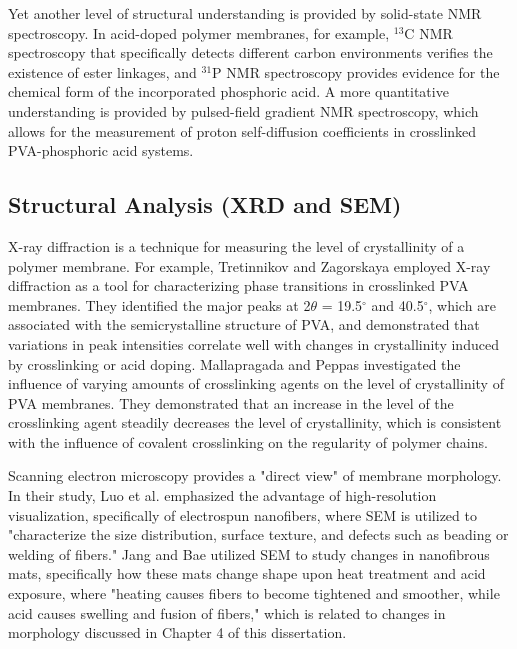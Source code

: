 \documentclass[12pt,a4paper]{report}
\begin{document}
Yet another level of structural understanding is provided by solid-state NMR spectroscopy. In acid-doped polymer membranes, for example, \(^{13}\)C NMR spectroscopy that specifically detects different carbon environments verifies the existence of ester linkages, and \(^{31}\)P NMR spectroscopy provides evidence for the chemical form of the incorporated phosphoric acid.\cite{52,59} A more quantitative understanding is provided by pulsed-field gradient NMR spectroscopy, which allows for the measurement of proton self-diffusion coefficients in crosslinked PVA-phosphoric acid systems.\cite{60}

\subsection{Structural Analysis (XRD and SEM)}
X-ray diffraction is a technique for measuring the level of crystallinity of a polymer membrane. For example, Tretinnikov and Zagorskaya employed X-ray diffraction as a tool for characterizing phase transitions in crosslinked PVA membranes. They identified the major peaks at 2\(\theta\) = 19.5\(^\circ\) and 40.5\(^\circ\), which are associated with the semicrystalline structure of PVA, and demonstrated that variations in peak intensities correlate well with changes in crystallinity induced by crosslinking or acid doping. \cite{33} Mallapragada and Peppas investigated the influence of varying amounts of crosslinking agents on the level of crystallinity of PVA membranes. They demonstrated that an increase in the level of the crosslinking agent steadily decreases the level of crystallinity, which is consistent with the influence of covalent crosslinking on the regularity of polymer chains.\cite{31}

Scanning electron microscopy provides a "direct view" of membrane morphology. In their study, Luo et al. emphasized the advantage of high-resolution visualization, specifically of electrospun nanofibers, where SEM is utilized to "characterize the size distribution, surface texture, and defects such as beading or welding of fibers.\cite{39}" Jang and Bae utilized SEM to study changes in nanofibrous mats, specifically how these mats change shape upon heat treatment and acid exposure, where "heating causes fibers to become tightened and smoother, while acid causes swelling and fusion of fibers," which is related to changes in morphology discussed in Chapter 4 of this dissertation.\cite{35}
\end{document}
